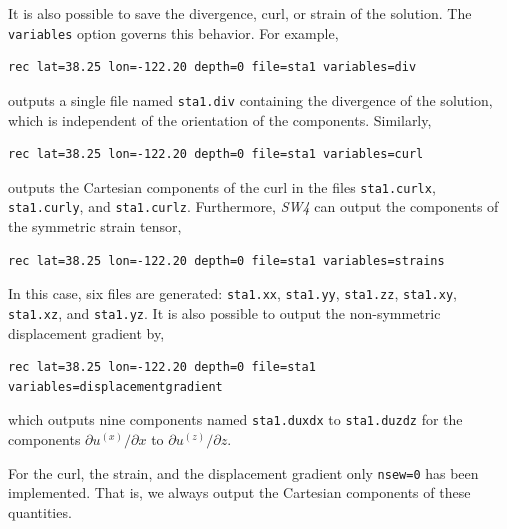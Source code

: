 \documentclass[11pt]{report}
\begin{document}
{It is also possible to save the divergence, curl, or strain of the solution. The {\tt variables}
option governs this behavior. For example,
\begin{verbatim}
rec lat=38.25 lon=-122.20 depth=0 file=sta1 variables=div
\end{verbatim}
outputs a single file named {\tt sta1.div} containing the divergence of the solution, which is
independent of the orientation of the components. Similarly,
\begin{verbatim}
rec lat=38.25 lon=-122.20 depth=0 file=sta1 variables=curl
\end{verbatim}
outputs the Cartesian components of the curl in the files {\tt sta1.curlx}, {\tt sta1.curly}, and
	{\tt sta1.curlz}. Furthermore, \emph{SW4} can output the components of the symmetric strain tensor,
\begin{verbatim}
rec lat=38.25 lon=-122.20 depth=0 file=sta1 variables=strains
\end{verbatim}
In this case, six files are generated: {\tt sta1.xx}, {\tt sta1.yy}, {\tt sta1.zz}, {\tt sta1.xy},
{\tt sta1.xz}, and {\tt sta1.yz}. It is also possible to output the non-symmetric displacement gradient by,
\begin{verbatim}
rec lat=38.25 lon=-122.20 depth=0 file=sta1 variables=displacementgradient
\end{verbatim}
which outputs nine components named {\tt sta1.duxdx} to {\tt sta1.duzdz} for the components $\partial u^{(x)}/\partial x$
to $\partial u^{(z)}/\partial z$.

For the curl, the strain, and the displacement gradient only \verb+nsew=0+ has been implemented. That is, we always output the
Cartesian components of these quantities.


}
\end{document}
